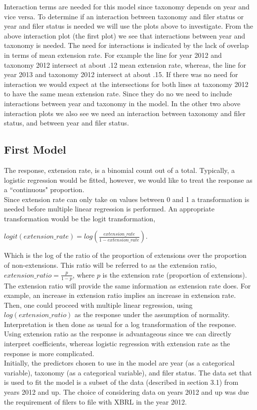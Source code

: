 \documentclass{article}
\begin{document}
\noindent Interaction terms are needed for this model since taxonomy depends on year and vice versa. To determine if an interaction between taxonomy and filer status or year and filer status is needed we will use the plots above to investigate. From the above interaction plot (the first plot) we see that interactions between year and taxonomy is needed. The need for interactions is indicated by the lack of overlap in terms of mean extension rate. For example the line for year 2012 and taxonomy 2012 intersect at about .12 mean extension rate, whereas, the line for year 2013 and taxonomy 2012 intersect at about .15. If there was no need for interaction we would expect at the intersections for both lines at taxonomy 2012 to have the same mean extension rate. Since they do no we need to include interactions between year and taxonomy in the model. In the other two above interaction plots we also see we need an interaction between taxonomy and filer status, and between year and filer status. \\

\subsection{First Model}
\noindent The response, extension rate, is a binomial count out of a total. Typically, a logistic regression would be fitted, however, we would like to treat the response as a ``continuous" proportion.\\
Since extension rate can only take on values between 0 and 1 a transformation is needed before multiple linear regression is performed. An appropriate transformation would be the logit transformation,
\begin{center}
$logit(extension\_ rate)=log(\frac{extension\_ rate}{1-extension\_ rate})$.
\end{center}
Which is the log of the ratio of the proportion of extensions over the proportion of non-extensions. This ratio will be referred to as the extension ratio, $extension\_ ratio = \frac{p}{1-p}$, where $p$ is the extension rate (proportion of extensions). The extension ratio will provide the same information as extension rate does. For example, an increase in extension ratio implies an increase in extension rate. Then, one could proceed with multiple linear regression, using $log(extension\_ ratio)$ as the response under the assumption of normality. Interpretation is then done as usual for a log transformation of the response. \\
Using extension ratio as the response is advantageous since we can directly interpret coefficients, whereas logistic regression with extension rate as the response is more complicated. \\
Initially, the predictors chosen to use in the model are year (as a categorical variable), taxonomy (as a categorical variable), and filer status. The data set that is used to fit the model is a subset of the data (described in section 3.1) from years 2012 and up. The choice of considering data on years 2012 and up was due the requirement of filers to file with XBRL in the year 2012.  
\end{document}
